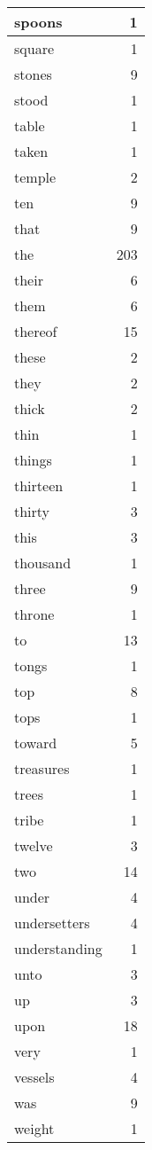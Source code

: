 \begin{center}
\begin{longtable}{l|r}
spoons & 1 \\ \hline
square & 1 \\ \hline
stones & 9 \\ \hline
stood & 1 \\ \hline
table & 1 \\ \hline
taken & 1 \\ \hline
temple & 2 \\ \hline
ten & 9 \\ \hline
that & 9 \\ \hline
the & 203 \\ \hline
their & 6 \\ \hline
them & 6 \\ \hline
thereof & 15 \\ \hline
these & 2 \\ \hline
they & 2 \\ \hline
thick & 2 \\ \hline
thin & 1 \\ \hline
things & 1 \\ \hline
thirteen & 1 \\ \hline
thirty & 3 \\ \hline
this & 3 \\ \hline
thousand & 1 \\ \hline
three & 9 \\ \hline
throne & 1 \\ \hline
to & 13 \\ \hline
tongs & 1 \\ \hline
top & 8 \\ \hline
tops & 1 \\ \hline
toward & 5 \\ \hline
treasures & 1 \\ \hline
trees & 1 \\ \hline
tribe & 1 \\ \hline
twelve & 3 \\ \hline
two & 14 \\ \hline
under & 4 \\ \hline
undersetters & 4 \\ \hline
understanding & 1 \\ \hline
unto & 3 \\ \hline
up & 3 \\ \hline
upon & 18 \\ \hline
very & 1 \\ \hline
vessels & 4 \\ \hline
was & 9 \\ \hline
weight & 1 \\ \hline

\end{longtable}
\end{center}
